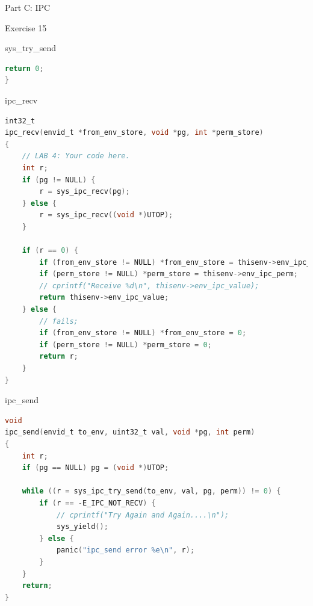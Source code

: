\documentclass[GBK,winfonts,a4paper,10pt]{ctexart}
\begin{document}
\begin{section}{ Part C: IPC }
\begin{subsection}{ Exercise 15 }
\begin{subsection}{ sys\_try\_send }
\begin{lstlisting}[language = C]
	return 0;
}
\end{lstlisting}
\end{subsection}

\begin{subsection}{ ipc\_recv }
\begin{lstlisting}[language = C]
int32_t
ipc_recv(envid_t *from_env_store, void *pg, int *perm_store)
{
	// LAB 4: Your code here.
	int r;
	if (pg != NULL) {
		r = sys_ipc_recv(pg);
	} else {
		r = sys_ipc_recv((void *)UTOP);
	}

	if (r == 0) {
		if (from_env_store != NULL) *from_env_store = thisenv->env_ipc_from;
		if (perm_store != NULL) *perm_store = thisenv->env_ipc_perm;
		// cprintf("Receive %d\n", thisenv->env_ipc_value);
		return thisenv->env_ipc_value;
	} else {
		// fails;
		if (from_env_store != NULL) *from_env_store = 0;
		if (perm_store != NULL) *perm_store = 0;
		return r;
	}
}
\end{lstlisting}
\end{subsection}

\begin{subsection}{ ipc\_send }
\begin{lstlisting}[language = C]
void
ipc_send(envid_t to_env, uint32_t val, void *pg, int perm)
{
	int r;
	if (pg == NULL) pg = (void *)UTOP;
	
	while ((r = sys_ipc_try_send(to_env, val, pg, perm)) != 0) {
		if (r == -E_IPC_NOT_RECV) {
			// cprintf("Try Again and Again....\n");
			sys_yield();
		} else {
			panic("ipc_send error %e\n", r);
		}
	}
	return;
}
\end{lstlisting}
\end{subsection}

\end{subsection}

\end{section}
\end{document}
